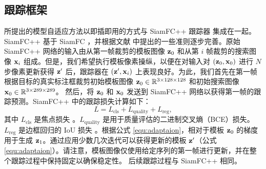 \subsection{跟踪框架}
所提出的模型自适应方法以即插即用的方式与 SiamFC++ 跟踪器 \cite{SiamFC++} 集成在一起。 SiamFC++ 基于 SiamFC \cite{SiamFC}，并根据文献 \cite{SiamFC++} 中提出的一些准则逐步完善。原始 SiamFC++ 网络的输入由从第一帧裁剪的模板图像 $\textbf z_0$ 和从第 $i$ 帧裁剪的搜索图像 $\textbf x_i$ 组成。但是，我们希望执行模板像素操纵，以便在对输入对 $(\textbf z_0, \textbf x_0)$ 进行 $N$ 步像素更新获得 $\textbf z'$ 后，跟踪器在 $(\textbf z', \textbf x_i)$ 上表现良好。为此，我们首先在第一帧根据目标的真实标注框裁剪初始模板图像 $\textbf z_0\in\mathbb R^{3\times128\times 128}$ 和初始搜索图像 $\textbf x_0\in\mathbb R^{3\times289\times 289}$。
然后，将 $\textbf z_0$ 和 $\textbf x_0$ 发送到 SiamFC++ 网络以获得第一帧的跟踪预测。SiamFC++ \cite{SiamFC++} 中的跟踪损失计算如下：
\begin{equation}
    L = L_{\text{cls}} + L_{\text{quality}} + L_{\text{reg}},
\end{equation}
其中 $L_{\text{cls}}$ 是焦点损失 \cite{focal}。$L_{\text{quality}}$ 是用于质量评估的二进制交叉熵（BCE）损失。$L_{\text{reg}}$ 是边框回归的 IoU 损失 \cite{yu2016unitbox}。根据公式 \ref{equ:adaptaion}，相对于模板 $\textbf z_0$ 的梯度用于生成 $\textbf z_1$。通过应用少数几次迭代可以获得更新的模板 $\textbf z'$（公式 \ref{equ:adaptaion}）。请注意，模板图像仅使用给定序列的第一帧进行更新，并在整个跟踪过程中保持固定以确保稳定性。
后续跟踪过程与 SiamFC++ 相同。

